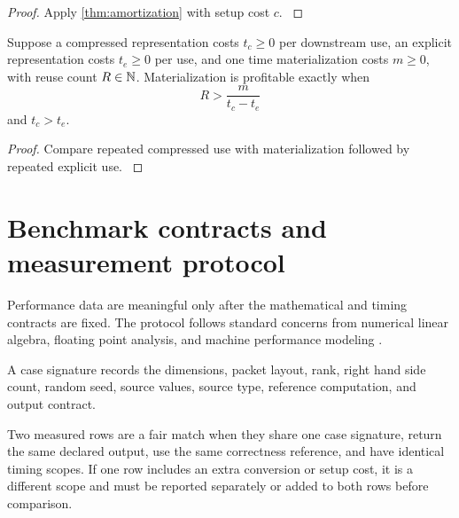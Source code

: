 \begin{proof}\label{main:proof:054}
Apply \cref{thm:amortization} with setup cost \(c\).
\label{main:proof:054:end}\end{proof}

\begin{corollary}\label{main:corollary:017}\label{cor:materialization_threshold}
Suppose a compressed representation costs $t_c\ge0$ per downstream use, an explicit representation costs $t_e\ge0$ per use, and one time materialization costs $m\ge0$, with reuse count $R\in\NN$. Materialization is profitable exactly when
\[
R>
\frac{m}{t_c-t_e}
\]
and \(t_c>t_e\).
\end{corollary}

\begin{proof}\label{main:proof:055}
Compare repeated compressed use with materialization followed by repeated explicit use.
\label{main:proof:055:end}\end{proof}

\section{Benchmark contracts and measurement protocol}\label{main:section:011}\label{sec:benchmark_protocol}

Performance data are meaningful only after the mathematical and timing contracts are fixed. The protocol follows standard concerns from numerical linear algebra, floating point analysis, and machine performance modeling \cite{Higham2002,GolubVanLoan2013,WilliamsWatermanPatterson2009}.

\begin{definition}\label{main:definition:015}\label{def:case_signature}
A case signature records the dimensions, packet layout, rank, right hand side count, random seed, source values, source type, reference computation, and output contract.
\end{definition}

\begin{definition}\label{main:definition:016}\label{def:fair_match}
Two measured rows are a fair match when they share one case signature, return the same declared output, use the same correctness reference, and have identical timing scopes. If one row includes an extra conversion or setup cost, it is a different scope and must be reported separately or added to both rows before comparison.
\end{definition}

